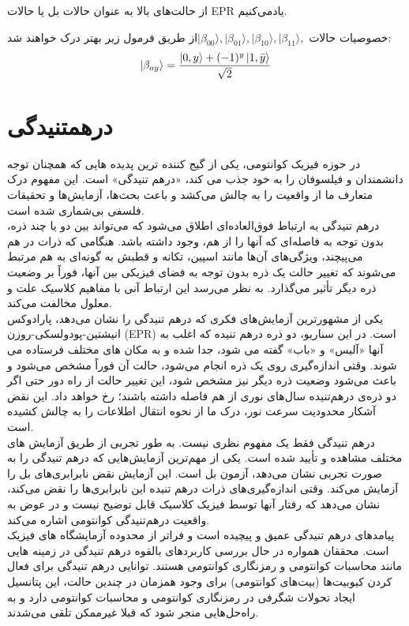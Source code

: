 \documentclass{book}
\begin{document}
 از حالت‌های بالا به عنوان حالات بل یا حالات EPR یاد‌می‌کنیم.
  
  
خصوصیات حالات $\vert \beta_{00} \rangle, \vert \beta_{01} \rangle, \vert \beta_{10} \rangle, \vert \beta_{11} \rangle,$از طریق فرمول زیر بهتر درک خواهند شد:
\begin{equation}\label{Bell formula}
	\ket{\beta_{ay}} = \frac{\ket{0, y} + (-1)^{y} \ket{1, \bar{y}}}{\sqrt{2}}
\end{equation}

\section{درهمتنیدگی}
در حوزه فیزیک کوانتومی، یکی از گیج کننده ترین پدیده هایی که همچنان توجه دانشمندان و فیلسوفان را به خود جذب می کند، «درهم تنیدگی» است. این مفهوم درک متعارف ما از واقعیت را به چالش می‌کشد و باعث بحث‌ها، آزمایش‌ها و تحقیقات فلسفی بی‌شماری شده است.\\
درهم تنیدگی به ارتباط فوق‌العاده‌ای اطلاق می‌شود که می‌تواند بین دو یا چند ذره، بدون توجه به فاصله‌ای که آنها را از هم، وجود داشته باشد. هنگامی که ذرات در هم می‌پیچند، ویژگی‌های آن‌ها مانند اسپین، تکانه و قطبش به گونه‌ای به هم مرتبط می‌شوند که تغییر حالت یک ذره بدون توجه به فضای فیزیکی بین آنها، فوراً بر وضعیت ذره دیگر تأثیر می‌گذارد. به نظر می‌رسد این ارتباط آنی با مفاهیم کلاسیک علت و معلول مخالفت می‌کند.\\

یکی از مشهورترین آزمایش‌های فکری که درهم تنیدگی را نشان می‌دهد، پارادوکس انیشتین-پودولسکی-روزن (EPR) است. در این سناریو، دو ذره درهم تنیده که اغلب به آنها «آلیس» و «باب» گفته می شود، جدا شده و به مکان های مختلف فرستاده می شوند. وقتی اندازه‌گیری روی یک ذره انجام می‌شود، حالت آن فوراً مشخص می‌شود و باعث می‌شود وضعیت ذره دیگر نیز مشخص شود، این تغییر حالت از راه دور حتی اگر دو ذره‌ی درهم‌تنیده سال‌های نوری از هم فاصله داشته باشند؛ رخ خواهد داد. این نقض آشکار محدودیت سرعت نور، درک ما از نحوه انتقال اطلاعات را به چالش کشیده است.\\

درهم تنیدگی فقط یک مفهوم نظری نیست. به طور تجربی از طریق آزمایش های مختلف مشاهده و تأیید شده است. یکی از مهم‌ترین آزمایش‌هایی که درهم تنیدگی را به صورت تجربی نشان می‌دهد، آزمون بل است.
این آزمایش نقض نابرابری‌های بل را آزمایش می‌کند. وقتی اندازه‌گیری‌های ذرات درهم تنیده این نابرابری‌ها را نقض می‌کند، نشان می‌دهد که رفتار آنها توسط فیزیک کلاسیک قابل توضیح نیست و در عوض به واقعیت درهم‌تنیدگی کوانتومی اشاره می‌کند.\\

پیامدهای درهم تنیدگی عمیق و پیچیده است و فراتر از محدوده آزمایشگاه های فیزیک است. محققان همواره در حال بررسی کاربردهای بالقوه درهم تنیدگی در زمینه هایی مانند محاسبات کوانتومی و رمزنگاری کوانتومی هستند. توانایی درهم تنیدگی برای فعال کردن کیوبیت‌ها (بیت‌های کوانتومی) برای وجود همزمان در چندین حالت، این پتانسیل ایجاد تحولات شگرفی در رمزنگاری کوانتومی و محاسبات کوانتومی دارد و به راه‌حل‌هایی منجر شود که قبلا غیرممکن تلقی می‌شدند.\\
\end{document}
